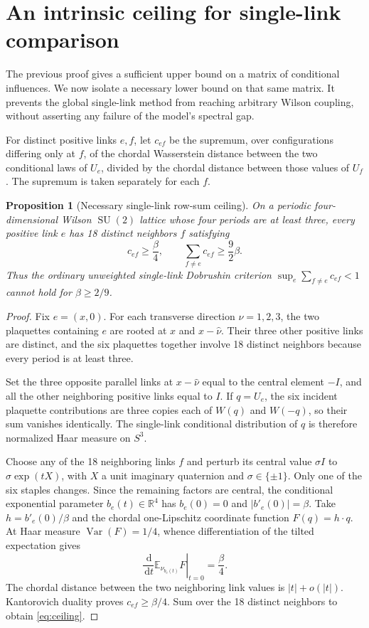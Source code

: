\documentclass[11pt,a4paper]{article}
\numberwithin{equation}{section}
\newtheorem{proposition}[theorem]{Proposition}
\newcommand{\SU}{\operatorname{SU}(2)}
\newcommand{\E}{\mathbb E}
\newcommand{\Var}{\operatorname{Var}}
\newcommand{\dd}{\,\mathrm d}
\begin{document}
\section{An intrinsic ceiling for single-link comparison}
\label{sec:ceiling}

The previous proof gives a sufficient upper bound on a matrix of
conditional influences. We now isolate a necessary lower bound on
that same matrix. It prevents the global single-link method from
reaching arbitrary Wilson coupling, without asserting any failure
of the model's spectral gap.

For distinct positive links \(e,f\), let \(c_{ef}\) be the supremum,
over configurations differing only at \(f\), of the chordal
Wasserstein distance between the two conditional laws of \(U_e\),
divided by the chordal distance between those values of \(U_f\).
The supremum is taken separately for each \(f\).

\begin{proposition}[Necessary single-link row-sum ceiling]
\label{prop:ceiling}
On a periodic four-dimensional Wilson \(\SU\) lattice whose four
periods are at least three, every positive link \(e\) has 18
distinct neighbors \(f\) satisfying
\begin{equation}
 c_{ef}\geq\frac{\beta}{4},\qquad
 \sum_{f\ne e}c_{ef}\geq\frac92\beta.          \label{eq:ceiling}
\end{equation}
Thus the ordinary unweighted single-link Dobrushin criterion
\(\sup_e\sum_{f\ne e}c_{ef}<1\) cannot hold for
\(\beta\geq2/9\).
\end{proposition}
\begin{proof}
Fix \(e=(x,0)\). For each transverse direction \(\nu=1,2,3\),
the two plaquettes containing \(e\) are rooted at \(x\)
and \(x-\hat\nu\). Their three other positive links are
distinct, and the six plaquettes together involve 18 distinct
neighbors because every period is at least three.

Set the three opposite parallel links at
\(x-\hat\nu\) equal to the central element \(-I\),
and all the other neighboring positive links equal to \(I\).
If \(q=U_e\), the six incident plaquette contributions are
three copies each of \(W(q)\) and \(W(-q)\), so their sum
vanishes identically. The single-link conditional distribution
of \(q\) is therefore normalized Haar measure on \(S^3\).

Choose any of the 18 neighboring links \(f\) and perturb its
central value \(\sigma I\) to \(\sigma\exp(tX)\), with
\(X\) a unit imaginary quaternion and \(\sigma\in\{\pm1\}\).
Only one of the six staples changes. Since the remaining factors
are central, the conditional exponential parameter
\(b_e(t)\in\mathbb R^4\) has \(b_e(0)=0\) and
\(|b'_e(0)|=\beta\). Take
\(h=b'_e(0)/\beta\) and the chordal one-Lipschitz
coordinate function \(F(q)=h\cdot q\). At Haar measure
\(\Var(F)=1/4\), whence differentiation of the tilted
expectation gives
\[
 \left.\frac{\dd}{\dd t}\E_{\nu_{b_e(t)}}F\right|_{t=0}
   =\frac{\beta}{4}.
\]
The chordal distance between the two neighboring link values
is \(|t|+o(|t|)\). Kantorovich duality proves
\(c_{ef}\geq\beta/4\). Sum over the 18 distinct
neighbors to obtain \eqref{eq:ceiling}.
\end{proof}
\end{document}
